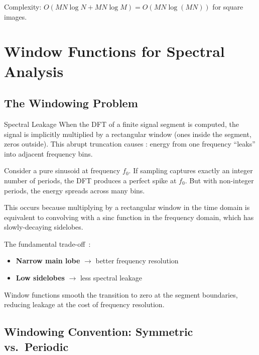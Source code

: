 Complexity: $O(MN \log N + MN \log M) = O(MN \log(MN))$ for square images.

\section{Window Functions for Spectral Analysis}\label{sec:windows}

\subsection{The Windowing Problem}\label{subsec:windowing_problem}

\begin{concept}{Spectral Leakage}
  When the DFT of a finite signal segment is computed, the signal is
  implicitly multiplied by a rectangular window (ones inside the
  segment, zeros outside). This abrupt truncation causes
  : energy from one frequency ``leaks''
  into adjacent frequency bins.

  Consider a pure sinusoid at frequency $f_0$. If sampling captures
  exactly an integer number of periods, the DFT produces a perfect spike at
  $f_0$. But with non-integer periods, the energy spreads across many bins.

  This occurs because multiplying by a rectangular window in the time
  domain is equivalent to convolving with a sinc function in the
  frequency domain, which has slowly-decaying sidelobes.
\end{concept}

The fundamental trade-off~\cite{harris1978use}:
\begin{itemize}[itemsep=3pt]
  \item \textbf{Narrow main lobe} $\rightarrow$ better frequency resolution
  \item \textbf{Low sidelobes} $\rightarrow$ less spectral leakage
\end{itemize}

Window functions smooth the transition to zero at the segment
boundaries, reducing leakage at the cost of frequency resolution.

\subsection{Windowing Convention: Symmetric
vs.\ Periodic}\label{subsec:windowing_convention}

